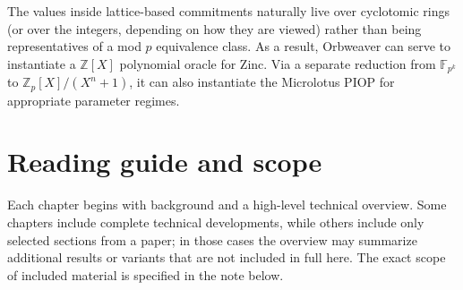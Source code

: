 The values inside lattice-based commitments naturally live over cyclotomic rings (or over the integers, depending on how they are viewed) rather than being representatives of a mod $p$ equivalence class. As a result, Orbweaver can serve to instantiate a $\mathbb{Z}[X]$ polynomial oracle for Zinc. Via a separate reduction from $\mathbb{F}_{p^k}$ to $\mathbb{Z}_p[X]/(X^n+1)$, it can also instantiate the Microlotus PIOP for appropriate parameter regimes.

\section{Reading guide and scope}
Each chapter begins with background and a high-level technical overview. Some chapters include complete technical developments, while others include only selected sections from a paper; in those cases the overview may summarize additional results or variants that are not included in full here. The exact scope of included material is specified in the note below.